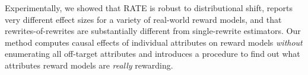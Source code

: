 \documentclass{article}
\begin{document}
Experimentally, we showed that RATE is robust to distributional shift, reports very different effect sizes for a variety of real-world reward models, and that rewrites-of-rewrites are substantially different from single-rewrite estimators. Our method computes causal effects of individual attributes on reward models \emph{without} enumerating all off-target attributes and introduces a procedure to find out what attributes reward models are \emph{really} rewarding.





\appendix
\end{document}
